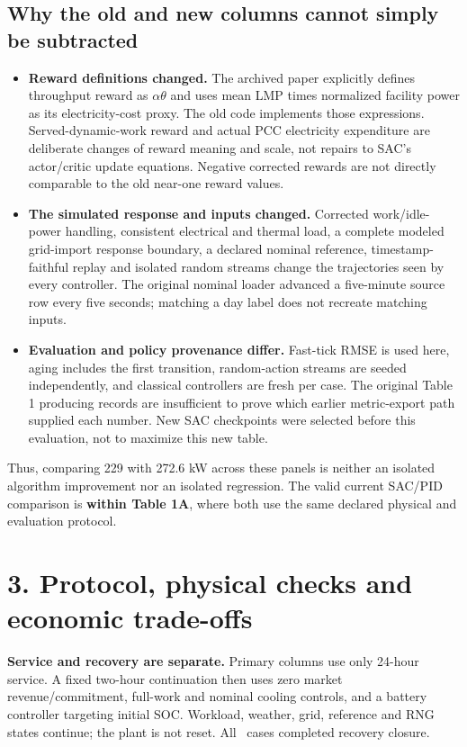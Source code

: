 \documentclass[10pt]{article}
\begin{document}
\subsection*{Why the old and new columns cannot simply be subtracted}
\begin{itemize}
\setlength{\itemsep}{4pt}
\item \textbf{Reward definitions changed.}
The archived paper explicitly defines throughput reward as
$\alpha\theta$ and uses mean LMP times normalized facility power as its
electricity-cost proxy. The old code implements those expressions.
Served-dynamic-work reward and actual PCC electricity expenditure are
deliberate changes of reward meaning and scale, not repairs to SAC's
actor/critic update equations. Negative corrected rewards are not directly
comparable to the old near-one reward values.
\item \textbf{The simulated response and inputs changed.}
Corrected work/idle-power handling, consistent electrical and thermal
load, a complete modeled grid-import response boundary, a declared
nominal reference, timestamp-faithful replay and isolated random streams
change the trajectories seen by every controller.
The original nominal loader advanced a five-minute source row every
five seconds; matching a day label does not recreate matching inputs.
\item \textbf{Evaluation and policy provenance differ.}
Fast-tick RMSE is used here, aging includes the first transition,
random-action streams are seeded independently, and classical controllers
are fresh per case. The original Table 1 producing records are insufficient
to prove which earlier metric-export path supplied each number.
New SAC checkpoints were selected before this evaluation, not to maximize
this new table.
\end{itemize}

Thus, comparing 229 with 272.6 kW across these panels is neither an isolated
algorithm improvement nor an isolated regression. The valid current
SAC/PID comparison is \textbf{within Table 1A}, where both use the same
declared physical and evaluation protocol.

\newpage
\section*{3. Protocol, physical checks and economic trade-offs}
\textbf{Service and recovery are separate.}
Primary columns use only 24-hour service. A fixed two-hour continuation
then uses zero market revenue/commitment, full-work and nominal cooling
controls, and a battery controller targeting initial SOC. Workload,
weather, grid, reference and RNG states continue; the plant is not reset.
All \CompletedCases\ cases completed recovery closure.
\end{document}
